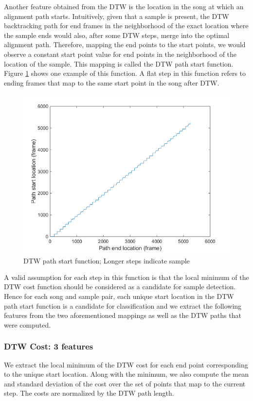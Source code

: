 \documentclass{article}
\begin{document}
Another feature obtained from the DTW is the location in the song at which an alignment path starts. Intuitively, given that a sample is present, the DTW backtracking path for end frames in the neighborhood of the exact location where the sample ends would also, after some DTW steps, merge into the optimal alignment path. Therefore, mapping the end points to the start points, we would observe a constant start point value for end points in the neighborhood of the location of the sample. This mapping is called the DTW path start function. Figure \ref{fig4} shows one example of this function. A flat step in this function refers to ending frames that map to the same start point in the song after DTW.

\begin{figure}[h!]
\centering
\includegraphics[width=\linewidth]{DTWpath.png}
\caption{DTW path start function; Longer steps indicate sample}
\label{fig4}
\end{figure}

A valid assumption for each step in this function is that the local minimum of the DTW cost function should be considered as a candidate for sample detection. Hence for each song and sample pair, each unique start location in the DTW path start function is a candidate for classification and we extract the following features from the two aforementioned mappings as well as the DTW paths that were computed.

\subsubsection{DTW Cost: 3 features}
We extract the local minimum of the DTW cost for each end point corresponding to the unique start location. Along with the minimum, we also compute the mean and standard deviation of the cost over the set of points that map to the current step. The costs are normalized by the DTW path length.
\end{document}
